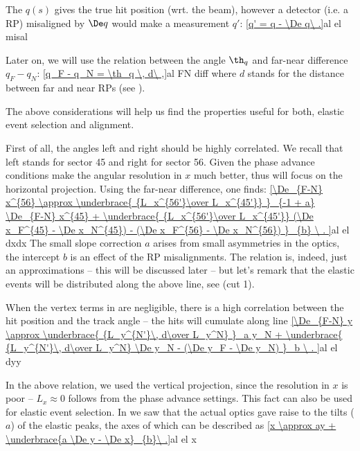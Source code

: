The $q(s)$ gives the true hit position (wrt. the beam), however a detector (i.e. a RP) misaligned by $\De q$ would make a measurement $q'$:
\eqref{q' = q - \De q\ .}{al el misal}

Later on, we will use the relation between the angle $\th_q$ and far-near difference $q_F - q_N$:
\eqref{q_F - q_N = \th_q \, d\ ,}{al FN diff}
where $d$ stands for the distance between far and near RPs (see ).

The above considerations will help us find the properties useful for both, elastic event selection and alignment.

First of all, the angles left and right should be highly correlated. We recall that left stands for sector 45 and right for sector 56. Given the phase advance conditions make the angular resolution in $x$ much better, thus will focus on the horizontal projection. Using the far-near difference, one finds:
\eqref{\De_{F-N} x^{56} \approx \underbrace{ {L_x^{56'}\over L_x^{45'}} }_{-1 + a} \De_{F-N} x^{45} + 
\underbrace{ {L_x^{56'}\over L_x^{45'}} (\De x_F^{45} - \De x_N^{45}) - (\De x_F^{56} - \De x_N^{56}) }_{b} \ .
}{al el dxdx}
The small slope correction $a$ arises from small asymmetries in the optics, the intercept $b$ is an effect of the RP misalignments. The relation is, indeed, just an approximations -- this will be discussed later -- but let's remark that the elastic events will be distributed along the above line, see  (cut 1).

When the vertex terms in  are negligible, there is a high correlation between the hit position and the track angle -- the hits will cumulate along line
\eqref{\De_{F-N} y \approx
\underbrace{ {L_y^{N'}\, d\over L_y^N} }_a y_N 
+ \underbrace{ {L_y^{N'}\, d\over L_y^N} \De y_N - (\De y_F - \De y_N) }_b \ .
}{al el dyy}

In the above relation, we used the vertical projection, since the resolution in $x$ is poor -- $L_x\approx 0$ follows from the phase advance settings. This fact can also be used for elastic event selection. In  we saw that the actual optics gave raise to the tilts ($a$) of the elastic peaks, the axes of which can be described as
\eqref{x \approx ay + \underbrace{a \De y - \De x}_{b}\ .}{al el x} 



